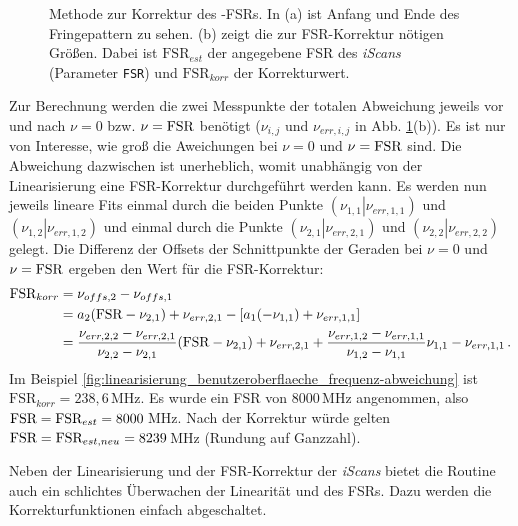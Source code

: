 \begin{figure}[h]
 	\centering
	\caption[\textit{iScan}-FSR-Korrektur -
	Methode]{Methode zur Korrektur des -FSRs. In (a) ist Anfang und
	Ende des Fringepattern zu sehen. (b) zeigt die zur FSR-Korrektur nötigen
	Größen. Dabei ist $\text{FSR}_{est}$ der angegebene FSR des \textit{iScans}
	(Parameter \lstinline|FSR|) und $\text{FSR}_{korr}$ der Korrekturwert.}
	\label{fig:FSR-korrektur}
\end{figure}
Zur Berechnung werden die zwei Messpunkte der totalen Abweichung jeweils vor und
nach $\nu=0$ bzw. $\nu=\text{\lstinline|FSR|}$ benötigt ($\nu_{i,j}$ und
$\nu_{err,i,j}$ in Abb. \ref{fig:FSR-korrektur}(b)). Es ist nur von Interesse,
wie groß die Aweichungen bei $\nu=0$ und $\nu=\text{\lstinline|FSR|}$ sind. Die Abweichung dazwischen ist
unerheblich, womit unabhängig von der Linearisierung eine FSR-Korrektur
durchgeführt werden kann. Es werden nun jeweils lineare Fits einmal durch die
beiden Punkte $(\left.\nu_{1,1}\right|\nu_{err,1,1})$ und
$(\left.\nu_{1,2}\right|\nu_{err,1,2})$ und einmal durch die Punkte
$(\left.\nu_{2,1}\right|\nu_{err,2,1})$ und
$(\left.\nu_{2,2}\right|\nu_{err,2,2})$ gelegt.
Die Differenz der Offsets der Schnittpunkte der Geraden bei $\nu=0$ und
$\nu=\text{\lstinline|FSR|}$ ergeben den Wert für die FSR-Korrektur:
\begin{equation}\label{eq:FSR_korrektur}
	\begin{split}
		\text{FSR}_{korr}
		&=\nu_{offs,2}-\nu_{offs,1}\\
		&=a_2(\text{\lstinline|FSR|}-\nu_{2,1})+\nu_{err,2,1}-[a_1(-\nu_{1,1})+\nu_{err,1,1}]\\
		&=\frac{\nu_{err,2,2}-\nu_{err,2,1}}{\nu_{2,2}-\nu_{2,1}}(\text{\lstinline|FSR|}-\nu_{2,1})+\nu_{err,2,1}+\frac{\nu_{err,1,2}-\nu_{err,1,1}}{\nu_{1,2}-\nu_{1,1}}\nu_{1,1}-\nu_{err,1,1}\,.
	\end{split}
\end{equation}
Im Beispiel \ref{fig:linearisierung_benutzeroberflaeche_frequenz-abweichung}
ist $\text{FSR}_{korr}=238,6\,$MHz. Es wurde ein FSR von $8000\,$MHz angenommen,
also $\text{\lstinline|FSR|}=\text{FSR}_{est}=8000\,$MHz. Nach der Korrektur
würde gelten $\text{\lstinline|FSR|}=\text{FSR}_{est,neu}=8239\,$MHz
(Rundung auf Ganzzahl).\par
Neben der Linearisierung und der FSR-Korrektur der
\textit{iScans} bietet die Routine auch ein schlichtes Überwachen der Linearität
und des FSRs. Dazu werden die Korrekturfunktionen einfach abgeschaltet.

